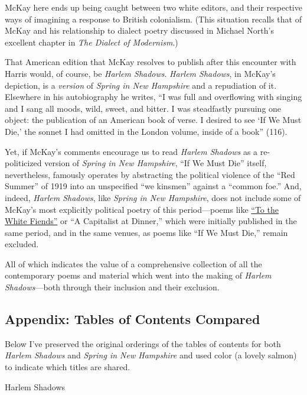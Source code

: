 \documentclass[
  12pt,
]{article}
\begin{document}
McKay here ends up being caught between two white editors, and their
respective ways of imagining a response to British colonialism. (This
situation recalls that of McKay and his relationship to dialect poetry
discussed in Michael North's excellent chapter in \emph{The Dialect of
Modernism}.)

That American edition that McKay resolves to publish after this
encounter with Harris would, of course, be \emph{Harlem Shadows}.
\emph{Harlem Shadows}, in McKay's depiction, is a \emph{version} of
\emph{Spring in New Hampshire} and a repudiation of it. Elsewhere in his
autobiography he writes, ``I was full and overflowing with singing and I
sang all moods, wild, sweet, and bitter. I was steadfastly pursuing one
object: the publication of an American book of verse. I desired to see
`If We Must Die,' the sonnet I had omitted in the London volume, inside
of a book'' (116).

Yet, if McKay's comments encourage us to read \emph{Harlem Shadows} as a
re-politicized version of \emph{Spring in New Hampshire}, ``If We Must
Die'' itself, nevertheless, famously operates by abstracting the
political violence of the ``Red Summer'' of 1919 into an unspecified
``we kinsmen'' against a ``common foe.'' And, indeed, \emph{Harlem
Shadows}, like \emph{Spring in New Hampshire}, does not include some of
McKay's most explicitly political poetry of this period---poems like
\href{http://harlemshadows.org/beta/index.html\#supp_mckay_to-the-white-fiends}{``To
the White Fiends''} or ``A Capitalist at Dinner,'' which were initially
published in the same period, and in the same venues, as poems like ``If
We Must Die,'' remain excluded.

All of which indicates the value of a comprehensive collection of all
the contemporary poems and material which went into the making of
\emph{Harlem Shadows}---both through their inclusion and their
exclusion.

\hypertarget{appendix-tables-of-contents-compared}{%
\subsection{Appendix: Tables of Contents
Compared}\label{appendix-tables-of-contents-compared}}

Below I've preserved the original orderings of the tables of contents
for both \emph{Harlem Shadows} and \emph{Spring in New Hampshire} and
used color (a lovely salmon) to indicate which titles are shared.

Harlem Shadows
\end{document}
